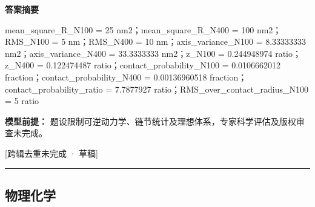 \documentclass[UTF8,11pt,a4paper]{ctexart}
\begin{document}
\noindent\textbf{答案摘要}\par
mean\_square\_R\_N100 = 25 nm2；mean\_square\_R\_N400 = 100 nm2；RMS\_N100 = 5 nm；RMS\_N400 = 10 nm；axis\_variance\_N100 = 8.33333333 nm2；axis\_variance\_N400 = 33.3333333 nm2；z\_N100 = 0.244948974 ratio；z\_N400 = 0.122474487 ratio；contact\_probability\_N100 = 0.0106662012 fraction；contact\_probability\_N400 = 0.00136960518 fraction；contact\_probability\_ratio = 7.7877927 ratio；RMS\_over\_contact\_radius\_N100 = 5 ratio\par
\noindent\textbf{模型前提：}
题设限制可逆动力学、链节统计及理想体系，专家科学评估及版权审查未完成。\par
\noindent\textcolor{red!65!black}{[跨辑去重未完成 · 草稿]} \par
\medskip\hrule\medskip
\subsection*{物理化学}
\end{document}
